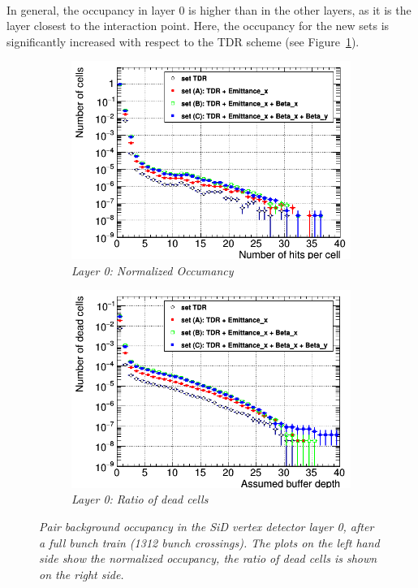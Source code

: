 \\In general, the occupancy in layer 0 is higher than in the other layers, as it is the layer closest to the interaction point.
Here, the occupancy for the new sets is significantly increased with respect to the TDR scheme (see Figure~\ref{fig:Layer0_Occupancy}). 
\begin{figure}[!h]
\centering
\begin{subfigure}[t]{0.45\textwidth}
\centering
\includegraphics[width=1.05\textwidth]{figures/Occupancy_Comparison_Layer_0_numcells_ILC250_Comparison_ALL_SETS_5T_w_antiDiD_LEG.png}
\caption{\textit{Layer 0: Normalized Occumancy}}
\end{subfigure}
\hspace*{0.3cm}
\begin{subfigure}[t]{0.45\textwidth}
\centering
\includegraphics[width=1.05\textwidth]{figures/Occupancy_Comparison_Layer_0_deadcells_ILC250_Comparison_ALL_SETS_5T_w_antiDiD_LEG.png}
\caption{\textit{Layer 0: Ratio of dead cells}}
\end{subfigure}
\caption{\textit{Pair background occupancy in the SiD vertex detector layer 0, after a full bunch train (1312 bunch crossings).
The plots on the left hand side show the normalized occupancy, the ratio of dead cells is shown on the right side.}}
\label{fig:Layer0_Occupancy}
\end{figure}

